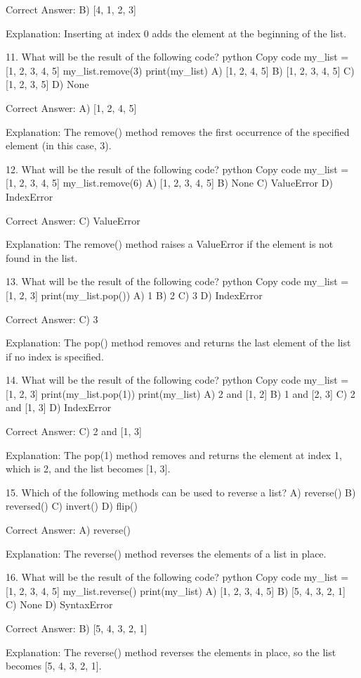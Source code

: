 Correct Answer: B) [4, 1, 2, 3]

Explanation:
Inserting at index 0 adds the element at the beginning of the list.

11. What will be the result of the following code?
python
Copy code
my_list = [1, 2, 3, 4, 5]
my_list.remove(3)
print(my_list)
A) [1, 2, 4, 5]
B) [1, 2, 3, 4, 5]
C) [1, 2, 3, 5]
D) None

Correct Answer: A) [1, 2, 4, 5]

Explanation:
The remove() method removes the first occurrence of the specified element (in this case, 3).

12. What will be the result of the following code?
python
Copy code
my_list = [1, 2, 3, 4, 5]
my_list.remove(6)
A) [1, 2, 3, 4, 5]
B) None
C) ValueError
D) IndexError

Correct Answer: C) ValueError

Explanation:
The remove() method raises a ValueError if the element is not found in the list.

13. What will be the result of the following code?
python
Copy code
my_list = [1, 2, 3]
print(my_list.pop())
A) 1
B) 2
C) 3
D) IndexError

Correct Answer: C) 3

Explanation:
The pop() method removes and returns the last element of the list if no index is specified.

14. What will be the result of the following code?
python
Copy code
my_list = [1, 2, 3]
print(my_list.pop(1))
print(my_list)
A) 2 and [1, 2]
B) 1 and [2, 3]
C) 2 and [1, 3]
D) IndexError

Correct Answer: C) 2 and [1, 3]

Explanation:
The pop(1) method removes and returns the element at index 1, which is 2, and the list becomes [1, 3].

15. Which of the following methods can be used to reverse a list?
A) reverse()
B) reversed()
C) invert()
D) flip()

Correct Answer: A) reverse()

Explanation:
The reverse() method reverses the elements of a list in place.

16. What will be the result of the following code?
python
Copy code
my_list = [1, 2, 3, 4, 5]
my_list.reverse()
print(my_list)
A) [1, 2, 3, 4, 5]
B) [5, 4, 3, 2, 1]
C) None
D) SyntaxError

Correct Answer: B) [5, 4, 3, 2, 1]

Explanation:
The reverse() method reverses the elements in place, so the list becomes [5, 4, 3, 2, 1].

